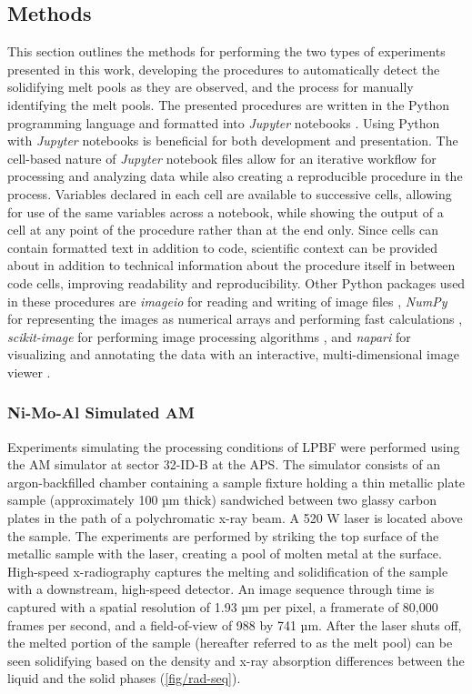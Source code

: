 \subsection{Methods}
This section outlines the methods for performing the two types of
experiments presented in this work, developing
the procedures to automatically detect the solidifying melt pools as they
are observed, and the process for manually identifying the melt pools.
The presented procedures are written in the Python programming language
and formatted into \textit{Jupyter} notebooks \cite{jupyter}. Using Python
with \textit{Jupyter}
notebooks is beneficial for both development and presentation. The
cell-based nature of \textit{Jupyter} notebook files allow for an iterative
workflow for processing and analyzing data while also creating a
reproducible procedure in the process.
Variables declared in each cell are available to successive cells, allowing
for use of the same variables across a notebook, while showing the output of
a cell at any point of the procedure rather than at the end only.
Since cells can contain formatted text in
addition to code, scientific context can be provided about in addition to
technical information about the procedure itself in
between code cells, improving readability and reproducibility.
Other Python packages used in these procedures are
\textit{imageio} for reading and writing of image files \cite{imageio},
\textit{NumPy} for representing the images as numerical arrays and
performing fast calculations \cite{numpy}, \textit{scikit-image} for
performing image processing algorithms \cite{skimage}, and \textit{napari}
for visualizing and annotating the data with an interactive,
multi-dimensional image viewer \cite{napari}.

\subsubsection{Ni-Mo-Al Simulated AM}
Experiments simulating the processing conditions of LPBF were
performed using the AM simulator at sector 32-ID-B at the APS.
The simulator consists of an argon-backfilled chamber containing
a sample fixture holding a thin metallic plate sample
(approximately 100 µm thick) sandwiched between
two glassy carbon plates in the path of a polychromatic x-ray beam.
A 520 W laser is located above the sample. The
experiments are performed by striking the top surface of the metallic
sample with the laser, creating a pool of molten metal at the surface.
High-speed x-radiography captures the melting and solidification of the
sample with a downstream, high-speed detector. An image sequence through
time is captured with a spatial resolution of 1.93 µm
per pixel, a framerate of 80,000 frames per second, and a field-of-view of
988 by 741 µm. After the laser shuts off, the melted portion of the sample
(hereafter referred to as the melt pool) can be seen solidifying based on
the density and x-ray absorption differences between the liquid and the
solid phases (\ref{fig/rad-seq}).

